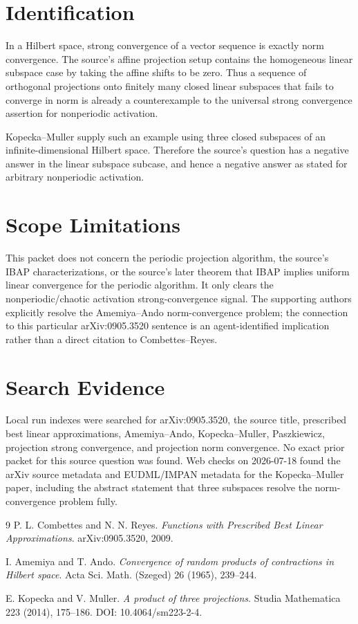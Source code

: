\documentclass[11pt]{article}
\begin{document}
\section*{Identification}

In a Hilbert space, strong convergence of a vector sequence is exactly norm
convergence. The source's affine projection setup contains the homogeneous
linear subspace case by taking the affine shifts to be zero. Thus a sequence of
orthogonal projections onto finitely many closed linear subspaces that fails
to converge in norm is already a counterexample to the universal strong
convergence assertion for nonperiodic activation.

Kopecka--Muller supply such an example using three closed subspaces of an
infinite-dimensional Hilbert space. Therefore the source's question has a
negative answer in the linear subspace subcase, and hence a negative answer as
stated for arbitrary nonperiodic activation.

\section*{Scope Limitations}

This packet does not concern the periodic projection algorithm, the source's
IBAP characterizations, or the source's later theorem that IBAP implies
uniform linear convergence for the periodic algorithm. It only clears the
nonperiodic/chaotic activation strong-convergence signal. The supporting
authors explicitly resolve the Amemiya--Ando norm-convergence problem; the
connection to this particular arXiv:0905.3520 sentence is an agent-identified
implication rather than a direct citation to Combettes--Reyes.

\section*{Search Evidence}

Local run indexes were searched for arXiv:0905.3520, the source title,
prescribed best linear approximations, Amemiya--Ando, Kopecka--Muller,
Paszkiewicz, projection strong convergence, and projection norm convergence.
No exact prior packet for this source question was found. Web checks on
2026-07-18 found the arXiv source metadata and EUDML/IMPAN metadata for the
Kopecka--Muller paper, including the abstract statement that three subspaces
resolve the norm-convergence problem fully.

\begin{thebibliography}{9}
P. L. Combettes and N. N. Reyes.
\emph{Functions with Prescribed Best Linear Approximations}. arXiv:0905.3520,
2009.

I. Amemiya and T. Ando.
\emph{Convergence of random products of contractions in Hilbert space}. Acta
Sci. Math. (Szeged) 26 (1965), 239--244.

E. Kopecka and V. Muller.
\emph{A product of three projections}. Studia Mathematica 223 (2014),
175--186. DOI: 10.4064/sm223-2-4.
\end{thebibliography}
\end{document}
